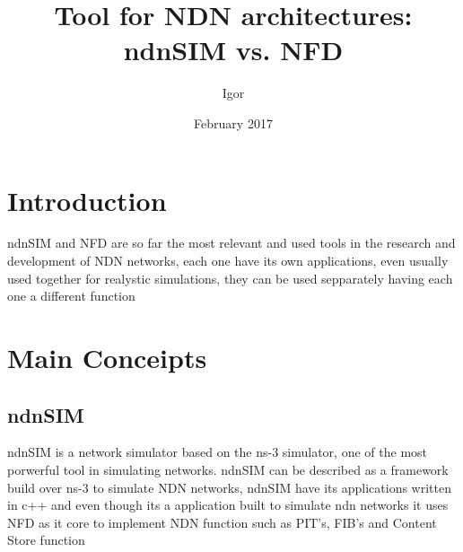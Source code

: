 \documentclass[preprint,12pt]{elsarticle}
\begin{document}
\begin{frontmatter}

\title{Tool for NDN architectures: ndnSIM vs. NFD}
\author{Igor}
\date{February 2017}
\address{Belém, Brazil}
\end{frontmatter}
\section{Introduction}
\label{S:1}
ndnSIM and NFD are so far the most relevant and used tools in the research and development of NDN networks, each one have its own  applications, even usually used together for realystic simulations, they can be used sepparately having each one a different function
\section{Main Conceipts}
\label{S:2}
\subsection{ndnSIM}
ndnSIM is a network simulator based on the ns-3 simulator, one of the most porwerful tool in simulating networks. ndnSIM can be described as a framework build over ns-3 to simulate NDN networks, ndnSIM have its applications written in c++ and even though its a application built to simulate ndn networks it uses NFD as it core to implement NDN function such as PIT's, FIB's and Content Store function
\end{document}

